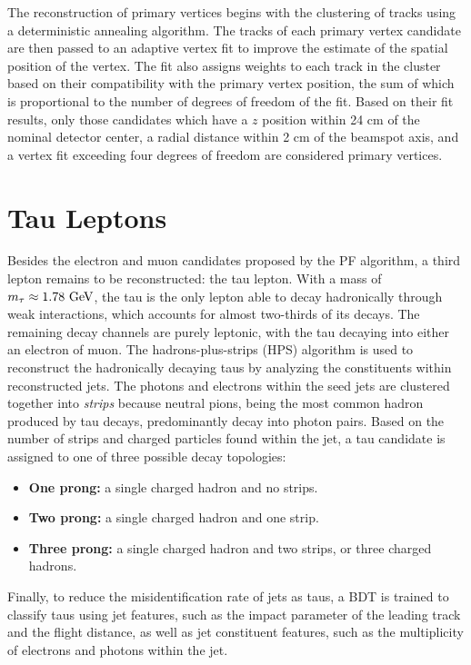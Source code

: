 The reconstruction of primary vertices begins with the clustering of tracks using a deterministic annealing algorithm.\cite{ITERTRACK} The tracks of each primary vertex candidate are then passed to an adaptive vertex fit to improve the estimate of the spatial position of the vertex.\cite{VERTEXFIT} The fit also assigns weights to each track in the cluster based on their compatibility with the primary vertex position, the sum of which is proportional to the number of degrees of freedom of the fit. Based on their fit results, only those candidates which have a $z$ position within 24 cm of the nominal detector center, a radial distance within 2 cm of the beamspot axis, and a vertex fit exceeding four degrees of freedom are considered primary vertices.

\section{Tau Leptons}

Besides the electron and muon candidates proposed by the PF algorithm, a third lepton remains to be reconstructed: the tau lepton. With a mass of $m_{\lept} \approx 1.78\ \GeV$\cite{PDG2018}, the tau is the only lepton able to decay hadronically through weak interactions, which accounts for almost two-thirds of its decays. The remaining decay channels are purely leptonic, with the tau decaying into either an electron of muon. The hadrons-plus-strips (HPS) algorithm\cite{TAURECO1,TAURECO2} is used to reconstruct the hadronically decaying taus by analyzing the constituents within reconstructed jets. The photons and electrons within the seed jets are clustered together into \textit{strips} because neutral pions, being the most common hadron produced by tau decays, predominantly decay into photon pairs. Based on the number of strips and charged particles found within the jet, a tau candidate is assigned to one of three possible decay topologies:
\begin{itemize}
  \item \textbf{One prong:} a single charged hadron and no strips.
  \item \textbf{Two prong:} a single charged hadron and one strip.
  \item \textbf{Three prong:} a single charged hadron and two strips, or three charged hadrons.
\end{itemize}
Finally, to reduce the misidentification rate of jets as taus, a BDT is trained to classify taus using jet features, such as the impact parameter of the leading track and the flight distance, as well as jet constituent features, such as the multiplicity of electrons and photons within the jet.

